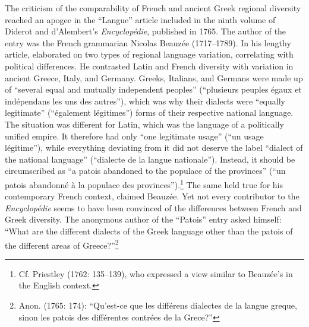 The criticism of the comparability of French and ancient Greek regional diversity reached an apogee in the “Langue” article included in the ninth volume of Diderot and d’Alembert’s \textit{Encyclopédie}, published in 1765. The author of the entry was the French grammarian Nicolas Beauzée (1717–1789). In his lengthy article, \citet[249]{Beauzée1765} elaborated on two types of regional language variation, correlating with political differences. He contrasted Latin and French diversity with variation in ancient Greece, Italy, and Germany. Greeks, Italians, and Germans were made up of “several equal and mutually independent peoples” (“plusieurs peuples égaux et indépendans les uns des autres”), which was why their dialects were “equally legitimate” (“également légitimes”) forms of their respective national language. The situation was different for Latin, which was the language of a politically unified empire. It therefore had only “one legitimate usage” (“un usage légitime”), while everything deviating from it did not deserve the label “dialect of the national language” (“dialecte de la langue nationale”). Instead, it should be circumscribed as “a patois abandoned to the populace of the provinces” (“un patois abandonné à la populace des provinces”).\footnote{Cf. Priestley (1762: 135–139), who expressed a view similar to Beauzée’s in the English context.} The same held true for his contemporary French context, claimed Beauzée. Yet not every contributor to the \textit{Encyclopédie} seems to have been convinced of the differences between French and Greek diversity. The anonymous author of the “Patois” entry asked himself: “What are the different dialects of the Greek language other than the patois of the different areas of Greece?”\footnote{Anon. (1765: 174): “Qu’est-ce que les différens dialectes de la langue greque, sinon les patois des différentes contrées de la Grece?”}

